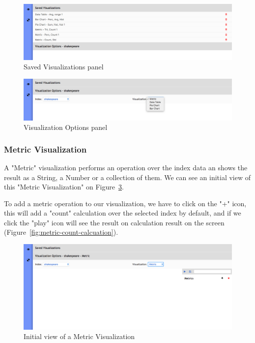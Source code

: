 \documentclass[a4paper, 12pt, english]{book}
\begin{document}
\begin{figure}
  \centering
  \includegraphics[width=13cm, keepaspectratio]{img/saved-visualizations.png}
  \caption{Saved Visualizations panel}
  \label{fig:saved-visualizations}
\end{figure}

\begin{figure}
  \centering
  \includegraphics[width=13cm, keepaspectratio]{img/visualization-options.png}
  \caption{Visualization Options panel}
  \label{fig:visualization-options}
\end{figure}

\subsubsection{Metric Visualization}
\label{sec:metric-visualization}
A "Metric" visualization performs an operation over the index data an shows the result as a String, a Number or a collection of them. We can see an initial view of this "Metric Visualization" on Figure~\ref{fig:metric-visualization-initial-view}.

To add a metric operation to our visualization, we have to click on the "+" icon, this will add a "count" calculation over the selected index by default, and if we click the "play" icon will see the result on calculation result on the screen (Figure~\ref{fig:metric-count-calcuation}).

\begin{figure}
  \centering
  \includegraphics[width=13cm, keepaspectratio]{img/metric-visualization-initial-view.png}
  \caption{Initial view of a Metric Visualization}
  \label{fig:metric-visualization-initial-view}
\end{figure}
\end{document}
